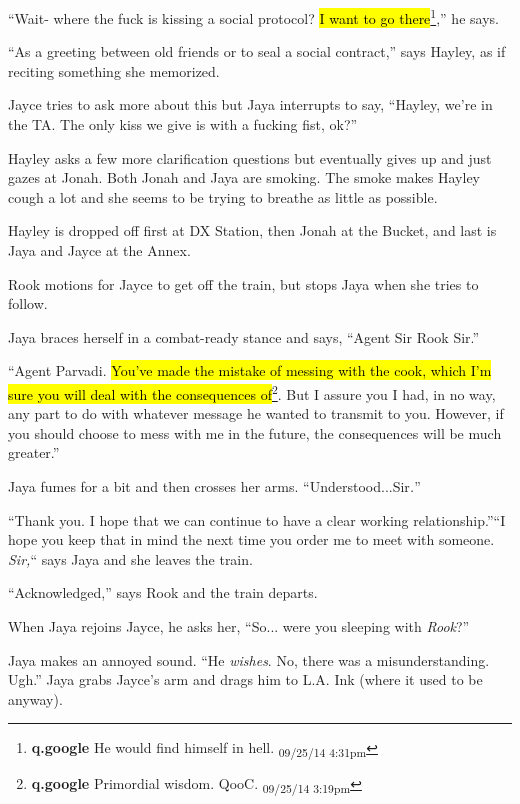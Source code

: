 ``Wait- where the fuck is kissing a social protocol?  \hl{I want to go there}\footnote{\textbf{q.google }He would find himself in hell. \textsubscript{09/25/14 4:31pm}},'' he says.

``As a greeting between old friends or to seal a social contract,'' says Hayley, as if reciting something she memorized.

Jayce tries to ask more about this but Jaya interrupts to say, ``Hayley, we're in the TA. The only kiss we give is with a fucking fist, ok?''

Hayley asks a few more clarification questions but eventually gives up and just gazes at Jonah.  Both Jonah and Jaya are smoking.  The smoke makes Hayley cough a lot and she seems to be trying to breathe as little as possible.



Hayley is dropped off first at DX Station, then Jonah at the Bucket, and last is Jaya and Jayce at the Annex.





Rook motions for Jayce to get off the train, but stops Jaya when she tries to follow.  

Jaya braces herself in a combat-ready stance and says, ``Agent Sir Rook Sir.''

``Agent Parvadi.  \hl{You've made the mistake of messing with the cook, which I'm sure you will deal with the consequences of}\footnote{\textbf{q.google }Primordial wisdom.
QooC. \textsubscript{09/25/14 3:19pm}}.  But I assure you I had, in no way, any part to do with whatever message he wanted to transmit to you.  However, if you should choose to mess with me in the future, the consequences will be much greater.''

Jaya fumes for a bit and then crosses her arms.  ``Understood...Sir\textit{.}''

``Thank you.  I hope that we can continue to have a clear working relationship.''``I hope you keep that in mind the next time you order me to meet with someone.  \textit{Sir,}`` says Jaya and she leaves the train.

``Acknowledged,'' says Rook and the train departs.



When Jaya rejoins Jayce, he asks her, ``So... were you sleeping with \textit{Rook}?''

Jaya makes an annoyed sound.  ``He \textit{wishes}.  No, there was a misunderstanding.  Ugh.''  Jaya grabs Jayce's arm and drags him to L.A. Ink (where it used to be anyway).

